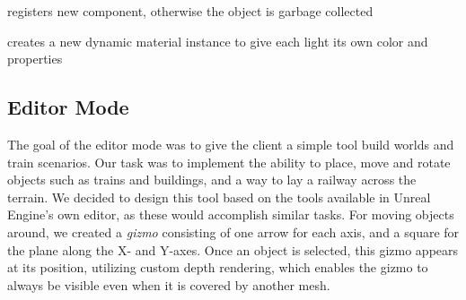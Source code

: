 registers new component, otherwise the object is garbage collected

creates a new dynamic material instance to give each light its own color and properties

\subsection{Editor Mode}
The goal of the editor mode was to give the client a simple tool build worlds and train scenarios. Our task was to implement the ability to place, move and rotate objects such as trains and buildings, and a way to lay a railway across the terrain. We decided to design this tool based on the tools available in Unreal Engine's own editor, as these would accomplish similar tasks. For moving objects around, we created a \textit{gizmo} consisting of one arrow for each axis, and a square for the plane along the X- and Y-axes. Once an object is selected, this gizmo appears at its position, utilizing custom depth rendering, which enables the gizmo to always be visible even when it is covered by another mesh. 

